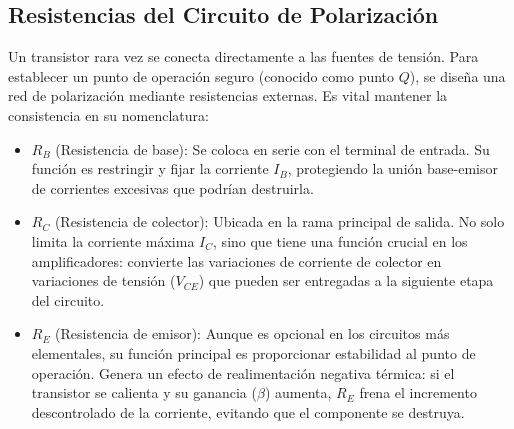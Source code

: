 \subsection{Resistencias del Circuito de Polarización}

Un transistor rara vez se conecta directamente a las fuentes de tensión. Para establecer un punto de operación seguro (conocido como punto \(Q\)), se diseña una red de polarización mediante resistencias externas. Es vital mantener la consistencia en su nomenclatura:

\begin{itemize}
  \item \(R_B\) (Resistencia de base): Se coloca en serie con el terminal de entrada. Su función es restringir y fijar la corriente \(I_B\), protegiendo la unión base-emisor de corrientes excesivas que podrían destruirla.
  \item \(R_C\) (Resistencia de colector): Ubicada en la rama principal de salida. No solo limita la corriente máxima \(I_C\), sino que tiene una función crucial en los amplificadores: convierte las variaciones de corriente de colector en variaciones de tensión (\(V_{CE}\)) que pueden ser entregadas a la siguiente etapa del circuito.
  \item \(R_E\) (Resistencia de emisor): Aunque es opcional en los circuitos más elementales, su función principal es proporcionar estabilidad al punto de operación. Genera un efecto de realimentación negativa térmica: si el transistor se calienta y su ganancia (\(\beta\)) aumenta, \(R_E\) frena el incremento descontrolado de la corriente, evitando que el componente se destruya.
\end{itemize}
